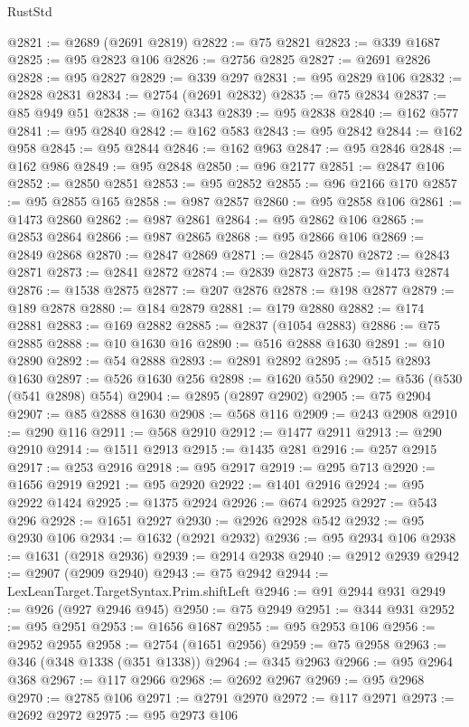 \begin{lexlean}{RustStd}
\begin{coremodule}
@2821 := @2689 (@2691 @2819)
@2822 := @75 @2821
@2823 := @339 @1687
@2825 := @95 @2823 @106
@2826 := @2756 @2825
@2827 := @2691 @2826
@2828 := @95 @2827
@2829 := @339 @297
@2831 := @95 @2829 @106
@2832 := @2828 @2831
@2834 := @2754 (@2691 @2832)
@2835 := @75 @2834
@2837 := @85 @949 @51
@2838 := @162 @343
@2839 := @95 @2838
@2840 := @162 @577
@2841 := @95 @2840
@2842 := @162 @583
@2843 := @95 @2842
@2844 := @162 @958
@2845 := @95 @2844
@2846 := @162 @963
@2847 := @95 @2846
@2848 := @162 @986
@2849 := @95 @2848
@2850 := @96 @2177
@2851 := @2847 @106
@2852 := @2850 @2851
@2853 := @95 @2852
@2855 := @96 @2166 @170
@2857 := @95 @2855 @165
@2858 := @987 @2857
@2860 := @95 @2858 @106
@2861 := @1473 @2860
@2862 := @987 @2861
@2864 := @95 @2862 @106
@2865 := @2853 @2864
@2866 := @987 @2865
@2868 := @95 @2866 @106
@2869 := @2849 @2868
@2870 := @2847 @2869
@2871 := @2845 @2870
@2872 := @2843 @2871
@2873 := @2841 @2872
@2874 := @2839 @2873
@2875 := @1473 @2874
@2876 := @1538 @2875
@2877 := @207 @2876
@2878 := @198 @2877
@2879 := @189 @2878
@2880 := @184 @2879
@2881 := @179 @2880
@2882 := @174 @2881
@2883 := @169 @2882
@2885 := @2837 (@1054 @2883)
@2886 := @75 @2885
@2888 := @10 @1630 @16
@2890 := @516 @2888 @1630
@2891 := @10 @2890
@2892 := @54 @2888
@2893 := @2891 @2892
@2895 := @515 @2893 @1630
@2897 := @526 @1630 @256
@2898 := @1620 @550
@2902 := @536 (@530 (@541 @2898) @554)
@2904 := @2895 (@2897 @2902)
@2905 := @75 @2904
@2907 := @85 @2888 @1630
@2908 := @568 @116
@2909 := @243 @2908
@2910 := @290 @116
@2911 := @568 @2910
@2912 := @1477 @2911
@2913 := @290 @2910
@2914 := @1511 @2913
@2915 := @1435 @281
@2916 := @257 @2915
@2917 := @253 @2916
@2918 := @95 @2917
@2919 := @295 @713
@2920 := @1656 @2919
@2921 := @95 @2920
@2922 := @1401 @2916
@2924 := @95 @2922 @1424
@2925 := @1375 @2924
@2926 := @674 @2925
@2927 := @543 @296
@2928 := @1651 @2927
@2930 := @2926 @2928 @542
@2932 := @95 @2930 @106
@2934 := @1632 (@2921 @2932)
@2936 := @95 @2934 @106
@2938 := @1631 (@2918 @2936)
@2939 := @2914 @2938
@2940 := @2912 @2939
@2942 := @2907 (@2909 @2940)
@2943 := @75 @2942
@2944 := LexLeanTarget.TargetSyntax.Prim.shiftLeft
@2946 := @91 @2944 @931
@2949 := @926 (@927 @2946 @945)
@2950 := @75 @2949
@2951 := @344 @931
@2952 := @95 @2951
@2953 := @1656 @1687
@2955 := @95 @2953 @106
@2956 := @2952 @2955
@2958 := @2754 (@1651 @2956)
@2959 := @75 @2958
@2963 := @346 (@348 @1338 (@351 @1338))
@2964 := @345 @2963
@2966 := @95 @2964 @368
@2967 := @117 @2966
@2968 := @2692 @2967
@2969 := @95 @2968
@2970 := @2785 @106
@2971 := @2791 @2970
@2972 := @117 @2971
@2973 := @2692 @2972
@2975 := @95 @2973 @106

\end{coremodule}
\end{lexlean}
